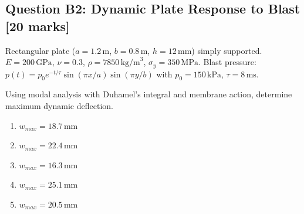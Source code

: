 \documentclass[12pt,a4paper]{article}
\begin{document}
\begin{questionbox}
\subsection*{Question B2: Dynamic Plate Response to Blast [20 marks]}
Rectangular plate ($a = 1.2\,\text{m}$, $b = 0.8\,\text{m}$, $h = 12\,\text{mm}$) simply supported.
$E = 200\,\text{GPa}$, $\nu = 0.3$, $\rho = 7850\,\text{kg/m}^3$, $\sigma_y = 350\,\text{MPa}$.
Blast pressure: $p(t) = p_0 e^{-t/\tau}\sin(\pi x/a)\sin(\pi y/b)$ with $p_0 = 150\,\text{kPa}$, $\tau = 8\,\text{ms}$.

\begin{center}
\end{center}

Using modal analysis with Duhamel's integral and membrane action, determine maximum dynamic deflection.

\begin{mcqbox}
\begin{enumerate}[label=(\Alph*),leftmargin=*]
    \item $w_{max} = 18.7\,\text{mm}$
    \item $w_{max} = 22.4\,\text{mm}$
    \item $w_{max} = 16.3\,\text{mm}$
    \item $w_{max} = 25.1\,\text{mm}$
    \item $w_{max} = 20.5\,\text{mm}$
\end{enumerate}
\end{mcqbox}
\end{questionbox}
\end{document}
